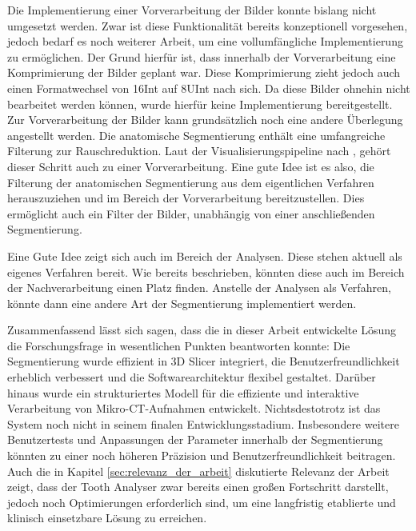 Die Implementierung einer Vorverarbeitung der Bilder konnte bislang nicht umgesetzt
werden. Zwar ist diese Funktionalität bereits konzeptionell vorgesehen, jedoch bedarf
es noch weiterer Arbeit, um eine vollumfängliche Implementierung zu ermöglichen.
Der Grund hierfür ist, dass innerhalb der Vorverarbeitung eine Komprimierung der
Bilder geplant war. Diese Komprimierung zieht jedoch auch einen Formatwechsel von
\ac{16Int} auf \ac{8UInt} nach sich. Da diese Bilder ohnehin nicht bearbeitet
werden können, wurde hierfür keine Implementierung bereitgestellt. Zur
Vorverarbeitung der Bilder kann grundsätzlich noch eine andere Überlegung
angestellt werden. Die anatomische Segmentierung enthält eine umfangreiche Filterung
zur Rauschreduktion. Laut der Visualisierungspipeline nach \citet[S.~50]{handels2000},
gehört dieser Schritt auch zu einer Vorverarbeitung. Eine gute Idee ist es also,
die Filterung der anatomischen Segmentierung aus dem eigentlichen Verfahren
herauszuziehen und im Bereich der Vorverarbeitung bereitzustellen. Dies ermöglicht
auch ein Filter der Bilder, unabhängig von einer anschließenden Segmentierung.

Eine Gute Idee zeigt sich auch im Bereich der Analysen. Diese stehen aktuell als
eigenes Verfahren bereit. Wie bereits beschrieben, könnten diese auch im Bereich
der Nachverarbeitung einen Platz finden. Anstelle der Analysen als Verfahren, könnte
dann eine andere Art der Segmentierung implementiert werden.

Zusammenfassend lässt sich sagen, dass die in dieser Arbeit entwickelte Lösung
die Forschungsfrage in wesentlichen Punkten beantworten konnte: Die Segmentierung
wurde effizient in 3D Slicer integriert, die Benutzerfreundlichkeit erheblich
verbessert und die Softwarearchitektur flexibel gestaltet. Darüber hinaus wurde ein
strukturiertes Modell für die effiziente und interaktive Verarbeitung von Mikro-\ac{CT}-Aufnahmen
entwickelt. Nichtsdestotrotz ist das System noch nicht in seinem finalen Entwicklungsstadium.
Insbesondere weitere Benutzertests und Anpassungen der Parameter innerhalb der
Segmentierung könnten zu einer noch höheren Präzision und Benutzerfreundlichkeit
beitragen. Auch die in Kapitel \ref{sec:relevanz_der_arbeit} diskutierte Relevanz
der Arbeit zeigt, dass der Tooth Analyser zwar bereits einen großen Fortschritt
darstellt, jedoch noch Optimierungen erforderlich sind, um eine langfristig
etablierte und klinisch einsetzbare Lösung zu erreichen.
